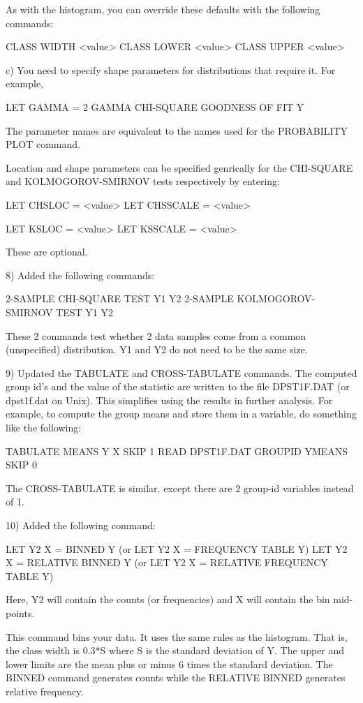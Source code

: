 {       As with the histogram, you can override these defaults with the
       following commands:
   
          CLASS WIDTH <value>
          CLASS LOWER <value>
          CLASS UPPER <value>

    c) You need to specify shape parameters for distributions that
       require it.  For example,

         LET GAMMA = 2
         GAMMA CHI-SQUARE GOODNESS OF FIT Y

       The parameter names are equivalent to the names used for
       the PROBABILITY PLOT command.

       Location and shape parameters can be specified genrically
       for the CHI-SQUARE and KOLMOGOROV-SMIRNOV tests respectively
       by entering:

         LET CHSLOC = <value>
         LET CHSSCALE = <value>

         LET KSLOC = <value>
         LET KSSCALE = <value>

       These are optional.

 8) Added the following commands:

       2-SAMPLE CHI-SQUARE TEST Y1 Y2
       2-SAMPLE KOLMOGOROV-SMIRNOV TEST Y1 Y2

    These 2 commands test whether 2 data samples come from a
    common (unspecified) distribution.  Y1 and Y2 do not need
    to be the same size.

 9) Updated the TABULATE and CROSS-TABULATE commands.  The computed
    group id's and the value of the statistic are written to
    the file DPST1F.DAT (or dpst1f.dat on Unix).  This simplifies
    using the results in further analysis.  For example, to
    compute the group means and store them in a variable, do
    something like the following:

       TABULATE MEANS Y X
       SKIP 1
       READ DPST1F.DAT GROUPID YMEANS
       SKIP 0

    The CROSS-TABULATE is similar, except there are 2 group-id
    variables instead of 1.
    
10) Added the following command:

       LET Y2 X = BINNED Y  (or LET Y2 X = FREQUENCY TABLE Y)
       LET Y2 X = RELATIVE BINNED Y
                  (or LET Y2 X = RELATIVE FREQUENCY TABLE Y)

    Here, Y2 will contain the counts (or frequencies) and X will
    contain the bin mid-points.

    This command bins your data.  It uses the same rules as the
    histogram.  That is, the class width is 0.3*S where S is the
    standard deviation of Y.  The upper and lower limits are
    the mean plus or minus 6 times the standard deviation.
    The BINNED command generates counts while the RELATIVE BINNED
    generates relative frequency.

}
